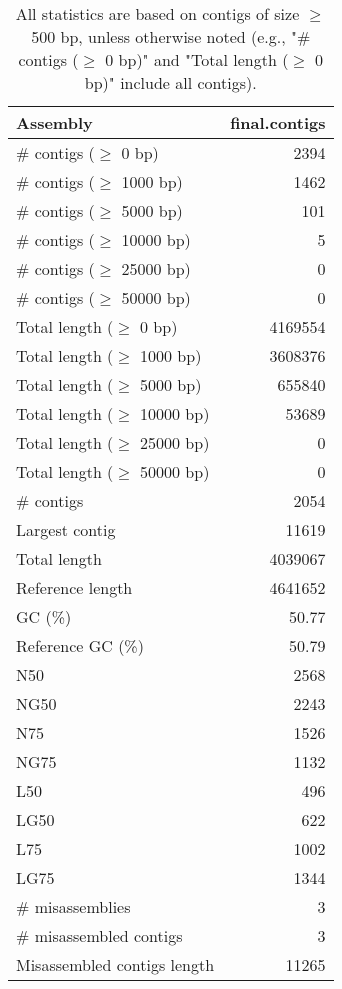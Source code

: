 \documentclass[12pt,a4paper]{article}
\begin{document}
\begin{table}[ht]
\begin{center}
\caption{All statistics are based on contigs of size $\geq$ 500 bp, unless otherwise noted (e.g., "\# contigs ($\geq$ 0 bp)" and "Total length ($\geq$ 0 bp)" include all contigs).}
\begin{tabular}{|l*{1}{|r}|}
\hline
Assembly & final.contigs \\ \hline
\# contigs ($\geq$ 0 bp) & 2394 \\ \hline
\# contigs ($\geq$ 1000 bp) & 1462 \\ \hline
\# contigs ($\geq$ 5000 bp) & 101 \\ \hline
\# contigs ($\geq$ 10000 bp) & 5 \\ \hline
\# contigs ($\geq$ 25000 bp) & 0 \\ \hline
\# contigs ($\geq$ 50000 bp) & 0 \\ \hline
Total length ($\geq$ 0 bp) & 4169554 \\ \hline
Total length ($\geq$ 1000 bp) & 3608376 \\ \hline
Total length ($\geq$ 5000 bp) & 655840 \\ \hline
Total length ($\geq$ 10000 bp) & 53689 \\ \hline
Total length ($\geq$ 25000 bp) & 0 \\ \hline
Total length ($\geq$ 50000 bp) & 0 \\ \hline
\# contigs & 2054 \\ \hline
Largest contig & 11619 \\ \hline
Total length & 4039067 \\ \hline
Reference length & 4641652 \\ \hline
GC (\%) & 50.77 \\ \hline
Reference GC (\%) & 50.79 \\ \hline
N50 & 2568 \\ \hline
NG50 & 2243 \\ \hline
N75 & 1526 \\ \hline
NG75 & 1132 \\ \hline
L50 & 496 \\ \hline
LG50 & 622 \\ \hline
L75 & 1002 \\ \hline
LG75 & 1344 \\ \hline
\# misassemblies & 3 \\ \hline
\# misassembled contigs & 3 \\ \hline
Misassembled contigs length & 11265 \\ \hline

\end{tabular}
\end{center}
\end{table}
\end{document}
